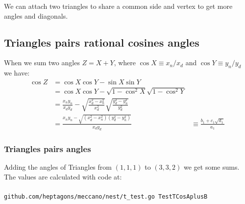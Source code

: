 \documentclass[11pt]{article}
\begin{document}
We can attach two triangles to share a common side and vertex to get more angles and diagonals.

\subsection{Triangles pairs rational cosines angles}
When we sum two angles $Z = X+Y$, where $\cos{X} \equiv x_n / x_d$ and $\cos{Y} \equiv y_n / y_d$ we have:
\begin{align}
\cos{Z} &= \cos{X}\cos{Y} - \sin{X}\sin{Y}\\
 &= \cos{X}\cos{Y} - \sqrt{1 - \cos^2{X}}\sqrt{1 - \cos^2{Y}}\\
 &= \frac{x_ny_n}{x_dy_d} - \sqrt{\frac{x_d^2 - x_n^2}{x_d^2}} \sqrt{\frac{y_d^2 - y_n^2}{y_d^2}}\\
 &= \frac{x_ny_n - \sqrt{(x_d^2 - x_n^2)(y_d^2 - y_n^2)}}{x_dy_d} &\equiv \frac{b_1+c_1\sqrt{d_1}}{a_1}
\end{align}

\subsubsection{Triangles pairs angles}

Adding the angles of Triangles from $(1,1,1)$ to $(3,3,2)$ we get some sums. The values are calculated with code at:
\\\\
\texttt{github.com/heptagons/meccano/nest/t\_test.go TestTCosAplusB}
\end{document}
